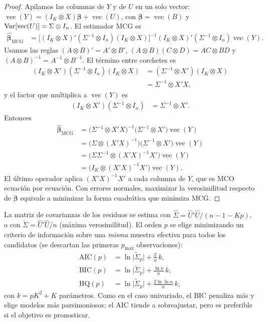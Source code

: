 \begin{proof}
Apilamos las columnas de $Y$ y de $U$ en un solo vector:
$\operatorname{vec}(Y)=(I_K\otimes X)\boldsymbol\beta+\operatorname{vec}(U)$, con
$\boldsymbol\beta=\operatorname{vec}(B)$ y $\operatorname{Var}[\operatorname{vec}(U)]=\Sigma\otimes I_n$. El estimador MCG es
\begin{align*}
  \hat{\boldsymbol\beta}_{\text{MCG}}
    &= \bigl[(I_K\otimes X)'(\Sigma^{-1}\otimes I_n)(I_K\otimes X)\bigr]^{-1}
       (I_K\otimes X)'(\Sigma^{-1}\otimes I_n)\operatorname{vec}(Y).
\end{align*}
Usamos las reglas $(A\otimes B)'=A'\otimes B'$, $(A\otimes B)(C\otimes D)=AC\otimes BD$ y
$(A\otimes B)^{-1}=A^{-1}\otimes B^{-1}$. El término entre corchetes es
\begin{align*}
  (I_K\otimes X')(\Sigma^{-1}\otimes I_n)(I_K\otimes X)
    &= (\Sigma^{-1}\otimes X')(I_K\otimes X)\\
    &= \Sigma^{-1}\otimes X'X,
\end{align*}
y el factor que multiplica a $\operatorname{vec}(Y)$ es
\begin{align*}
  (I_K\otimes X')(\Sigma^{-1}\otimes I_n) &= \Sigma^{-1}\otimes X'.
\end{align*}
Entonces
\begin{align*}
  \hat{\boldsymbol\beta}_{\text{MCG}}
    &= \bigl(\Sigma^{-1}\otimes X'X\bigr)^{-1}\bigl(\Sigma^{-1}\otimes X'\bigr)\operatorname{vec}(Y)\\
    &= \bigl(\Sigma\otimes(X'X)^{-1}\bigr)\bigl(\Sigma^{-1}\otimes X'\bigr)\operatorname{vec}(Y)\\
    &= \bigl(\Sigma\Sigma^{-1}\otimes(X'X)^{-1}X'\bigr)\operatorname{vec}(Y)\\
    &= \bigl(I_K\otimes(X'X)^{-1}X'\bigr)\operatorname{vec}(Y).
\end{align*}
El último operador aplica $(X'X)^{-1}X'$ a cada columna de $Y$, que es MCO ecuación por ecuación. Con errores
normales, maximizar la verosimilitud respecto de $\boldsymbol\beta$ equivale a minimizar la forma cuadrática que
minimiza MCG.
\end{proof}

La matriz de covarianzas de los residuos se estima con $\hat\Sigma=\hat U'\hat U/(n-1-Kp)$, o con $\tilde\Sigma=\hat
U'\hat U/n$ (máxima verosimilitud). El orden $p$ se elige minimizando un criterio de información sobre una
\emph{misma} muestra efectiva para todos los candidatos (se descartan las primeras $p_{\max}$ observaciones):
\begin{align*}
  \text{AIC}(p) &= \ln\bigl|\tilde\Sigma_p\bigr|+\frac{2}{n}\,k,\\
  \text{BIC}(p) &= \ln\bigl|\tilde\Sigma_p\bigr|+\frac{\ln n}{n}\,k,\\
  \text{HQ}(p)  &= \ln\bigl|\tilde\Sigma_p\bigr|+\frac{2\ln\ln n}{n}\,k,
\end{align*}
con $k=pK^2+K$ parámetros. Como en el caso univariado, el BIC penaliza más y elige modelos más parsimoniosos; el
AIC tiende a sobreajustar, pero es preferible si el objetivo es pronosticar.

